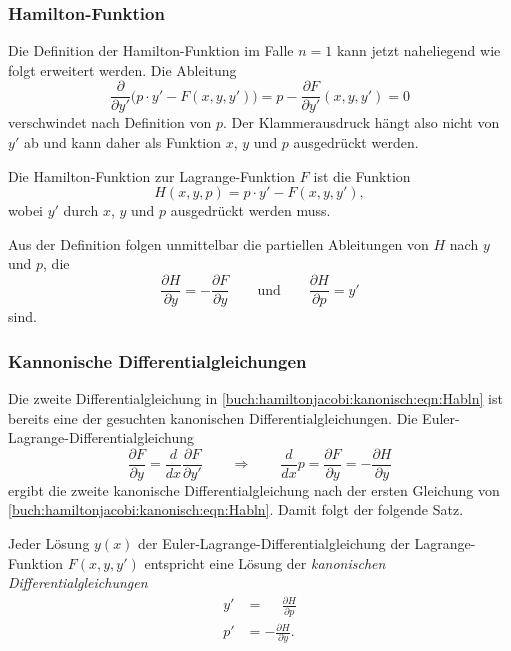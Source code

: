 %
%
\subsubsection{Hamilton-Funktion}
Die Definition der Hamilton-Funktion im Falle $n=1$ kann jetzt
naheliegend wie folgt erweitert werden.
Die Ableitung
\begin{equation*}
\frac{\partial}{\partial y'}
\bigl(
p\cdot y'
-
F(x,y,y')
\bigr)
=
p
-
\frac{\partial F}{\partial y'}(x,y,y')
=
0
\end{equation*}
verschwindet nach Definition von $p$.
Der Klammerausdruck hängt also nicht von $y'$ ab und kann daher 
als Funktion $x$, $y$ und $p$ ausgedrückt werden.

\begin{definition}
Die Hamilton-Funktion zur Lagrange-Funktion $F$ ist die Funktion
\[
H(x,y,p)
=
p\cdot y' - F(x,y,y'),
\]
wobei $y'$ durch $x$, $y$ und $p$ ausgedrückt werden muss.
\end{definition}

Aus der Definition folgen unmittelbar die partiellen Ableitungen
von $H$ nach $y$ und $p$, die
\begin{equation}
\frac{\partial H}{\partial y}
=
-\frac{\partial F}{\partial y}
\qquad\text{und}\qquad
\frac{\partial H}{\partial p}
=
y'
\label{buch:hamiltonjacobi:kanonisch:eqn:Habln}
\end{equation}
sind.

%
%
\subsubsection{Kannonische Differentialgleichungen}
Die zweite Differentialgleichung in
\eqref{buch:hamiltonjacobi:kanonisch:eqn:Habln}
ist bereits eine der gesuchten kanonischen Differentialgleichungen.
Die Euler-Lagrange-Differentialgleichung
\[
\frac{\partial F}{\partial y}=
\frac{d}{dx}\frac{\partial F}{\partial y'}
\qquad\Rightarrow\qquad
\frac{d}{dx}p
=
\frac{\partial F}{\partial y}
=
-\frac{\partial H}{\partial y}
\]
ergibt die zweite kanonische Differentialgleichung nach der
ersten Gleichung von \eqref{buch:hamiltonjacobi:kanonisch:eqn:Habln}.
Damit folgt der folgende Satz.

\begin{satz}
\label{buch:hamiltonjacobi:kanonisch:satz:kandgln}
Jeder Lösung $y(x)$ der Euler-Lagrange-Differentialgleichung der
Lagrange-Funktion $F(x,y,y')$ entspricht eine Lösung
der {\em kanonischen Differentialgleichungen}
%
\begin{equation}
\begin{aligned}
y'&=\phantom{-}\frac{\partial H}{\partial p}
\\
p'&=-\frac{\partial H}{\partial y}.
\end{aligned}
\end{equation}
\end{satz}

